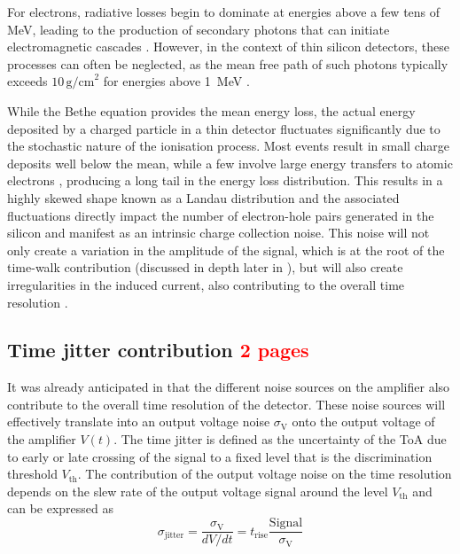 		For electrons, radiative losses begin to dominate at energies above a few tens of MeV, leading to the production of secondary photons that can initiate electromagnetic cascades \cite{Paolozzi_thesis}. However, in the context of thin silicon detectors, these processes can often be neglected, as the mean free path of such photons typically exceeds $10\,\text{g/cm}^2$ for energies above \SI{1}{\mega\electronvolt} \cite{PDG}.

		While the Bethe equation provides the mean energy loss, the actual energy deposited by a charged particle in a thin detector fluctuates significantly due to the stochastic nature of the ionisation process. Most events result in small charge deposits well below the mean, while a few involve large energy transfers to atomic electrons , producing a long tail in the energy loss distribution. This results in a highly skewed shape known as a Landau distribution and the associated fluctuations directly impact the number of electron-hole pairs generated in the silicon and manifest as an intrinsic charge collection noise. This noise will not only create a variation in the amplitude of the signal, which is at the root of the time-walk contribution (discussed in depth later in ), but will also create irregularities in the induced current, also contributing to the overall time resolution \cite{timepix4}. 

		\subsection{Time jitter contribution \textcolor{red}{ 2 pages}}
		
		It was already anticipated in  that the different noise sources on the amplifier also contribute to the overall time resolution of the detector. These noise sources will effectively translate into an output voltage noise $\sigma_\text{V}$ onto the output voltage of the amplifier $V(t)$. The time jitter is defined as the uncertainty of the ToA due to early or late crossing of the signal to a fixed level that is the discrimination threshold $V_{\text{th}}$. The contribution of the output voltage noise on the time resolution depends on the slew rate of the output voltage signal around the level $V_{\text{th}}$ and can be expressed as
		\begin{equation}
			\sigma_{\text{jitter}} = \frac{\sigma_{\text{V}}}{dV/dt} = t_{\text{rise}} \frac{\text{Signal}}{\sigma_{\text{V}}}
		\end{equation}  
		
